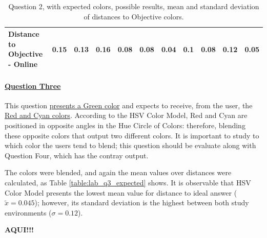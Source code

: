 \begin{table}[H]
{\begin{tabular}{lccccccccccccc}
    \multicolumn{4}{l}{Distance to Objective - Online}                                                                                               & \multicolumn{1}{|c}{0.15}       & \multicolumn{1}{c|}{0.13}    & \multicolumn{1}{|c}{0.16}       & \multicolumn{1}{c|}{0.08}    & \multicolumn{1}{|c}{\textbf{0.08}}       & \multicolumn{1}{c|}{0.04}    & \multicolumn{1}{|c}{0.1}        & \multicolumn{1}{c|}{0.08}    & \multicolumn{1}{|c}{0.12}       & \multicolumn{1}{c|}{0.05}    \\ \hline
    \end{tabular}}
  \caption[Question 2, with expected Results.]{Question 2, with expected colors, possible results, mean and standard deviation of distances to Objective colors.}
  \label{table:lab_q2_expected}
\end{table}
%
%
\paragraph{\ul{Question Three}}
%
This question \ul{presents a Green color} and expects to receive, from the user, the \ul{Red and Cyan colors}. According to the HSV Color Model, Red and Cyan are positioned in
opposite angles in the Hue Circle of Colors: therefore, blending these opposite colors that output two different colors. It is important to study to which color the users tend
to blend; this question should be evaluate along with Question Four, which has the contray output. \par
%
The colors were blended, and again the mean values over distances were calculated, as Table \ref{table:lab_q3_expected} shows. It is observable that HSV Color Model presents
the lowest mean value for distance to ideal answer ($\tilde{x} = 0.045$); however, its standard deviation is the highest between both study environments ($\sigma = 0.12$). \par
%
\textbf{AQUI!!!} \par
%
%
